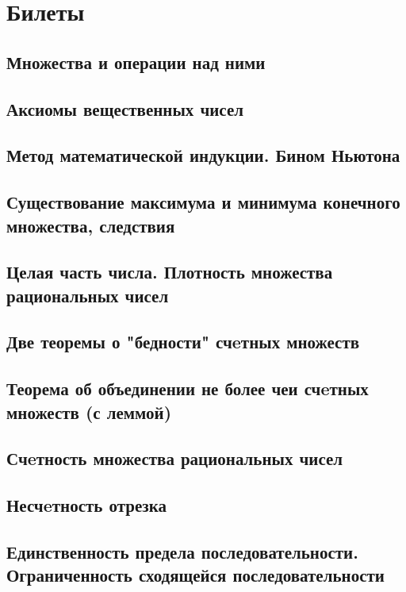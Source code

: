 \tableofcontents
\newpage
\section{Билеты}
\subsection{Множества и операции над ними}

\skip
\subsection{Аксиомы вещественных чисел}

\skip
\subsection{Метод математической индукции. Бином Ньютона}

\skip
\subsection{Существование максимума и минимума конечного множества, следствия}

\skip
\subsection{Целая часть числа. Плотность множества рациональных чисел}

\skip
\subsection{Две теоремы о "бедности" счeтных множеств}

\skip
\subsection{Теорема об объединении не более чеи счeтных множеств (с леммой)}

\skip
\subsection{Счeтность множества рациональных чисел}

\skip
\subsection{Несчeтность отрезка}

\skip
\subsection{Единственность предела последовательности. Ограниченность сходящейся последовательности}

\skip
